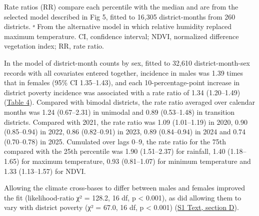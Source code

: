 \documentclass[11pt,a4paper]{article}
\begin{document}
\noindent Rate ratios (RR) compare each percentile with the median and are from the selected model described in Fig 5, fitted to 16,305 district-months from 260 districts. ᵃ From the alternative model in which relative humidity replaced maximum temperature. CI, confidence interval; NDVI, normalized difference vegetation index; RR, rate ratio.\par\endgroup
\medskip

In the model of district-month counts by sex, fitted to 32,610 district-month-sex records with all covariates entered together, incidence in males was 1.39 times that in females (95\% CI 1.35--1.43), and each 10-percentage-point increase in district poverty incidence was associated with a rate ratio of 1.34 (1.20--1.49) (\hyperref[table4]{Table 4}). Compared with bimodal districts, the rate ratio averaged over calendar months was 1.24 (0.67--2.31) in unimodal and 0.89 (0.53--1.48) in transition districts. Compared with 2021, the rate ratio was 1.09 (1.01--1.19) in 2020, 0.90 (0.85--0.94) in 2022, 0.86 (0.82--0.91) in 2023, 0.89 (0.84--0.94) in 2024 and 0.74 (0.70--0.78) in 2025. Cumulated over lags 0--9, the rate ratio for the 75th compared with the 25th percentile was 1.90 (1.51--2.37) for rainfall, 1.40 (1.18--1.65) for maximum temperature, 0.93 (0.81--1.07) for minimum temperature and 1.33 (1.13--1.57) for NDVI.

Allowing the climate cross-bases to differ between males and females improved the fit (likelihood-ratio χ² = 128.2, 16 df, p \textless{} 0.001), as did allowing them to vary with district poverty (χ² = 67.0, 16 df, p \textless{} 0.001) (\hyperref[s1text-d]{S1 Text, section D}).
\end{document}
